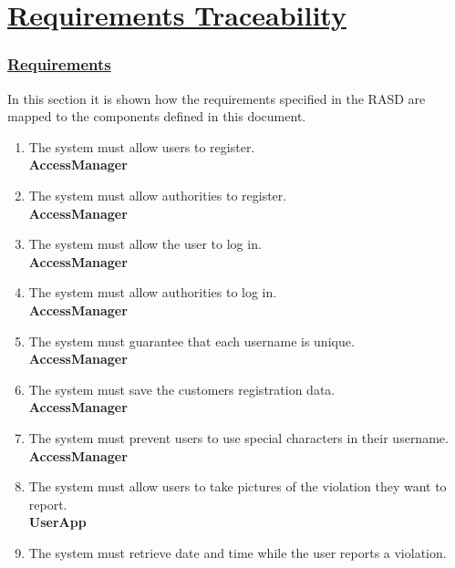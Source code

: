 \section[Requirements Traceability]{\hyperlink{toc}{Requirements Traceability}}
	\label{sec:requirementsTraceability}
	
	\subsubsection[Requirements]{\hyperlink{toc}{Requirements}}
	In this section it is shown how the requirements specified in the RASD are mapped
	to the components defined in this document.
	
	\begin{enumerate}[label=\textbf{R\arabic*}]
		\item \label{req:userReg} The system must allow users to register.\\
		\textbf{AccessManager}
		\item \label{req:authorityReg} The system must allow authorities to register.\\
		\textbf{AccessManager}
		\item \label{req:userLogin} The system must allow the user to log in.\\
		\textbf{AccessManager}
		\item \label{req:authorityLogin} The system must allow authorities to log in.\\
		\textbf{AccessManager}
		\item \label{req:uniqueName} The system must guarantee that each username is unique.\\
		\textbf{AccessManager}
		\item \label{req:saveRegData} The system must save the customers registration data.\\
		\textbf{AccessManager}
		\item \label{req:specialCharacters} The system must prevent users to use special characters in their username.\\
		\textbf{AccessManager}
		\item \label{req:takePictures} The system must allow users to take pictures of the violation they want to report.\\
		\textbf{UserApp}
		\item \label{req:dateTime} The system must retrieve date and time while the user reports a violation.\\

\end{enumerate}
